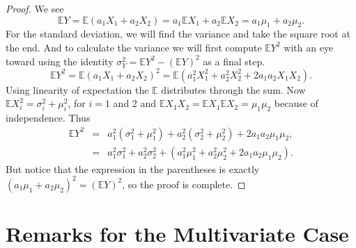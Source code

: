 \begin{proof}
We see \[ \mathbb{E}
Y=\mathbb{E}\left(a_{1}X_{1}+a_{2}X_{2}\right)=a_{1}\mathbb{E}
X_{1}+a_{2}\mathbb{E} X_{2}=a_{1}\mu_{1}+a_{2}\mu_{2}.  \] For the
standard deviation, we will find the variance and take the square root
at the end. And to calculate the variance we will first compute
\(\mathbb{E} Y^{2}\) with an eye toward using the identity
\(\sigma_{Y}^{2}=\mathbb{E} Y^{2}-\left(\mathbb{E} Y\right)^{2}\) as a
final step.  \[ \mathbb{E}
Y^{2}=\mathbb{E}\left(a_{1}X_{1}+a_{2}X_{2}\right)^{2}=\mathbb{E}\left(a_{1}^{2}X_{1}^{2}+a_{2}^{2}X_{2}^{2}+2a_{1}a_{2}X_{1}X_{2}\right).
\] Using linearity of expectation the \(\mathbb{E}\) distributes
through the sum. Now \(\mathbb{E}
X_{i}^{2}=\sigma_{i}^{2}+\mu_{i}^{2}\), for \(i=1\) and 2 and
\(\mathbb{E} X_{1}X_{2}=\mathbb{E} X_{1}\mathbb{E}
X_{2}=\mu_{1}\mu_{2}\) because of independence. Thus
\begin{eqnarray*}
\mathbb{E} Y^{2} & = & a_{1}^{2}(\sigma_{1}^{2}+\mu_{1}^{2})+a_{2}^{2}(\sigma_{2}^{2}+\mu_{2}^{2})+2a_{1}a_{2}\mu_{1}\mu_{2},\\
 & = & a_{1}^{2}\sigma_{1}^{2}+a_{2}^{2}\sigma_{2}^{2}+\left(a_{1}^{2}\mu_{1}^{2}+a_{2}^{2}\mu_{2}^{2}+2a_{1}a_{2}\mu_{1}\mu_{2}\right).
\end{eqnarray*}
But notice that the expression in the parentheses is exactly
\(\left(a_{1}\mu_{1}+a_{2}\mu_{2}\right)^{2}=\left(\mathbb{E}
Y\right)^{2}\), so the proof is complete.
\end{proof}

\section{Remarks for the Multivariate Case}
\label{sec-7-8}

